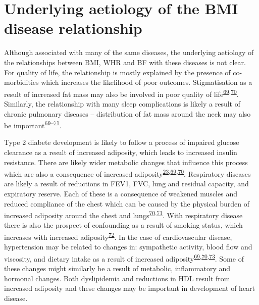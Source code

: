 \documentclass[11pt,twoside]{bristolthesis}
\begin{document}
\hypertarget{chapter1-underlying-aetiology}{%
\section{Underlying aetiology of the BMI disease relationship}\label{chapter1-underlying-aetiology}}

Although associated with many of the same diseases, the underlying aetiology of the relationships between BMI, WHR and BF with these diseases is not clear. For quality of life, the relationship is mostly explained by the presence of co-morbidities which increases the likelihood of poor outcomes. Stigmatisation as a result of increased fat mass may also be involved in poor quality of life\textsuperscript{\protect\hyperlink{ref-Bray2004}{69},\protect\hyperlink{ref-Haslam2005}{70}}. Similarly, the relationship with many sleep complications is likely a result of chronic pulmonary diseases -- distribution of fat mass around the neck may also be important\textsuperscript{\protect\hyperlink{ref-Bray2004}{69}--\protect\hyperlink{ref-Poulain2006}{71}}.

Type 2 diabete development is likely to follow a process of impaired glucose clearance as a result of increased adiposity, which leads to increased insulin resistance. There are likely wider metabolic changes that influence this process which are also a consequence of increased adiposity\textsuperscript{\protect\hyperlink{ref-Collaboration2009}{23},\protect\hyperlink{ref-Bray2004}{69},\protect\hyperlink{ref-Haslam2005}{70}}. Respiratory diseases are likely a result of reductions in FEV1, FVC, lung and residual capacity, and expiratory reserve. Each of these is a consequence of weakened muscles and reduced compliance of the chest which can be caused by the physical burden of increased adiposity around the chest and lungs\textsuperscript{\protect\hyperlink{ref-Haslam2005}{70},\protect\hyperlink{ref-Poulain2006}{71}}. With respiratory disease there is also the prospect of confounding as a result of smoking status, which increases with increased adiposity\textsuperscript{\protect\hyperlink{ref-Carreras-Torres2018}{72}}. In the case of cardiovascular disease, hypertension may be related to changes in: sympathetic activity, blood flow and viscosity, and dietary intake as a result of increased adiposity\textsuperscript{\protect\hyperlink{ref-Bray2004}{69},\protect\hyperlink{ref-Haslam2005}{70},\protect\hyperlink{ref-Jayedi2018}{73}}. Some of these changes might similarly be a result of metabolic, inflammatory and hormonal changes. Both dyslipidemia and reductions in HDL result from increased adiposity and these changes may be important in development of heart disease.
\end{document}
